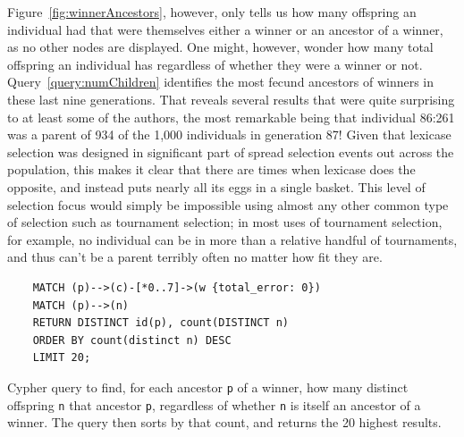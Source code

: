 Figure~\ref{fig:winnerAncestors},
however, only tells us how many offspring an individual had that were themselves either a winner
or an ancestor of a winner, as no other nodes are displayed. One
might, however, wonder how many total offspring an individual has
regardless of whether they were a winner or not. Query~\ref{query:numChildren} identifies the most
fecund ancestors of winners in these last nine generations. That reveals several results that were
quite surprising to at least some of the authors, the most remarkable being that individual 86:261 
was a parent of 934 of the 1,000 individuals in generation 87! Given that lexicase selection was
designed in significant part of spread selection events out across the population, this makes it
clear that there are times when lexicase does the opposite, and instead puts nearly all its eggs in
a single basket. This level of selection focus would simply be impossible using almost any other
common type of selection such as tournament selection; in most uses of tournament selection, 
for example, no individual can be in more than a relative handful of tournaments, and thus can't be
a parent terribly often no matter how fit they are.

\begin{Query}
	\smallskip
	\begin{verbatim}
	MATCH (p)-->(c)-[*0..7]->(w {total_error: 0}) 
	MATCH (p)-->(n) 
	RETURN DISTINCT id(p), count(DISTINCT n) 
	ORDER BY count(distinct n) DESC
	LIMIT 20;
	\end{verbatim}
	\caption{Cypher query to find, for each ancestor \texttt{p} of a winner, how many distinct offspring 
		\texttt{n} that ancestor \texttt{p}, regardless of whether \texttt{n} is itself an
		ancestor of a winner. The query then sorts by that count, and returns the 20 highest results.}
	\label{query:numChildren}
\end{Query}


